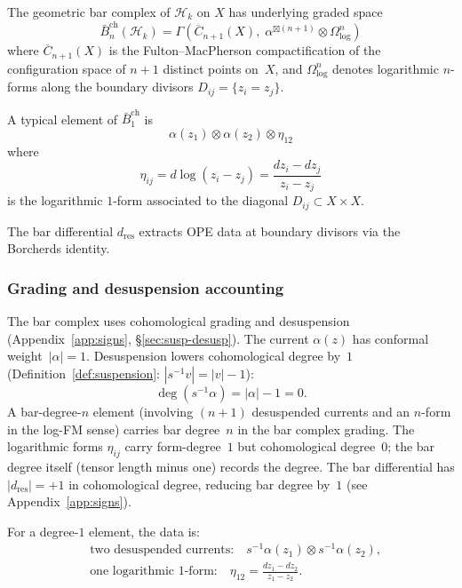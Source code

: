 The geometric bar complex of $\mathcal{H}_k$ on $X$ has underlying
graded space
\begin{equation}\label{eq:frame-bar-graded}
\bar{B}^{\mathrm{ch}}_n(\mathcal{H}_k) = \Gamma\!\left(
 \overline{C}_{n+1}(X),\;
 \alpha^{\boxtimes(n+1)} \otimes \Omega^n_{\log}
\right)
\end{equation}
where $\overline{C}_{n+1}(X)$ is the Fulton--MacPherson compactification
of the configuration space of $n+1$ distinct points on~$X$, and
$\Omega^n_{\log}$ denotes logarithmic $n$-forms along the boundary
divisors $D_{ij} = \{z_i = z_j\}$.

A typical element of $\bar{B}^{\mathrm{ch}}_1$ is
\begin{equation}\label{eq:frame-bar1-element}
\alpha(z_1) \otimes \alpha(z_2) \otimes \eta_{12}
\end{equation}
where
\begin{equation}\label{eq:frame-eta-def}
\eta_{ij} = d\log(z_i - z_j) = \frac{dz_i - dz_j}{z_i - z_j}
\end{equation}
is the logarithmic $1$-form associated to the diagonal
$D_{ij} \subset X \times X$.

The bar differential $d_{\mathrm{res}}$ extracts OPE data at boundary
divisors via the Borcherds identity.

\subsubsection*{Grading and desuspension accounting}

The bar complex uses cohomological grading and desuspension
(Appendix~\ref{app:signs}, \S\ref{sec:susp-desusp}).
The current $\alpha(z)$ has conformal weight~$|\alpha| = 1$.
Desuspension lowers cohomological degree by~$1$
(Definition~\ref{def:suspension}: $|s^{-1}v| = |v| - 1$):
\begin{equation}\label{eq:frame-desuspension-shift}
\deg(s^{-1}\alpha) = |\alpha| - 1 = 0.
\end{equation}
A bar-degree-$n$ element (involving $(n+1)$ desuspended currents
and an $n$-form in the log-FM sense) carries bar degree~$n$ in
the bar complex grading. The logarithmic forms $\eta_{ij}$
carry form-degree~$1$ but cohomological degree~$0$; the bar
degree itself (tensor length minus one) records the degree. The bar
differential has $|d_{\mathrm{res}}| = +1$ in cohomological degree,
reducing bar degree by~$1$ (see Appendix~\ref{app:signs}).

For a degree-$1$ element, the data is:
\begin{align}
&\text{two desuspended currents:} \quad
 s^{-1}\alpha(z_1) \otimes s^{-1}\alpha(z_2),
 \label{eq:frame-deg1-currents} \\
&\text{one logarithmic $1$-form:} \quad
 \eta_{12} = \frac{dz_1 - dz_2}{z_1 - z_2}.
 \label{eq:frame-deg1-form}
\end{align}

